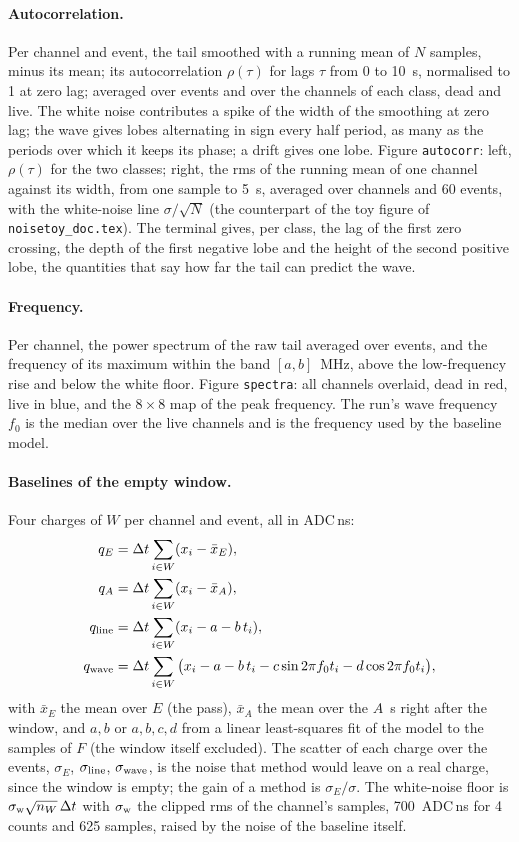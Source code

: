 \documentclass[11pt]{article}
\newcommand{\code}[1]{\texttt{#1}}
\newcommand{\us}{\textmu s}
\begin{document}
\paragraph{Autocorrelation.} Per channel and event, the tail smoothed
with a running mean of $N$ samples, minus its mean; its autocorrelation
$\rho(\tau)$ for lags $\tau$ from 0 to 10~\us, normalised to 1 at zero
lag; averaged over events and over the channels of each class, dead and
live. The white noise contributes a spike of the width of the smoothing
at zero lag; the wave gives lobes alternating in sign every half period,
as many as the periods over which it keeps its phase; a drift gives one
lobe. Figure \code{autocorr}: left, $\rho(\tau)$ for the two classes;
right, the rms of the running mean of one channel against its width,
from one sample to 5~\us, averaged over channels and 60 events, with the
white-noise line $\sigma/\sqrt N$ (the counterpart of the toy figure of
\code{noisetoy\_doc.tex}). The terminal gives, per class, the lag of the first zero
crossing, the depth of the first negative lobe and the height of the
second positive lobe, the quantities that say how far the tail can
predict the wave.

\paragraph{Frequency.} Per channel, the power spectrum of the raw tail
averaged over events, and the frequency of its maximum within the band
$[a, b]$~MHz, above the low-frequency rise and below the white floor.
Figure \code{spectra}: all channels overlaid, dead in red, live in blue,
and the $8\times8$ map of the peak frequency. The run's wave frequency
$f_0$ is the median over the live channels and is the frequency used by
the baseline model.

\paragraph{Baselines of the empty window.} Four charges of $W$ per
channel and event, all in ADC\,ns:
\begin{align*}
  q_E &= \Delta t \sum_{i \in W} (x_i - \bar x_E), \\
  q_A &= \Delta t \sum_{i \in W} (x_i - \bar x_A), \\
  q_{\rm line} &= \Delta t \sum_{i \in W} (x_i - a - b\,t_i), \\
  q_{\rm wave} &= \Delta t \sum_{i \in W} \big(x_i - a - b\,t_i - c \sin 2\pi f_0 t_i - d \cos 2\pi f_0 t_i\big),
\end{align*}
with $\bar x_E$ the mean over $E$ (the pass), $\bar x_A$ the mean over
the $A$~\us{} right after the window, and $a, b$ or $a, b, c, d$
from a linear least-squares fit of the model to the samples of $F$
(the window itself excluded). The scatter of each charge over the
events, $\sigma_E$, $\sigma_{\rm line}$, $\sigma_{\rm wave}$, is the
noise that method would leave on a real charge, since the window is
empty; the gain of a method is $\sigma_E / \sigma$. The white-noise
floor is $\sigma_{\rm w} \sqrt{n_W}\,\Delta t$ with $\sigma_{\rm w}$ the
clipped rms of the channel's samples, 700~ADC\,ns for 4 counts and 625
samples, raised by the noise of the baseline itself.
\end{document}
